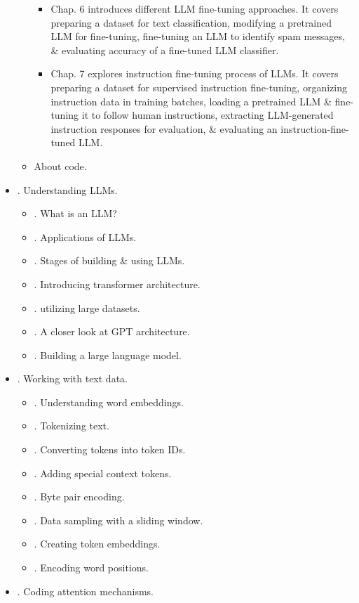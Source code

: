 \documentclass{article}
\begin{document}
\begin{itemize}
\begin{itemize}
\begin{itemize}
			\item Chap. 6 introduces different LLM fine-tuning approaches. It covers preparing a dataset for text classification, modifying a pretrained LLM for fine-tuning, fine-tuning an LLM to identify spam messages, \& evaluating accuracy of a fine-tuned LLM classifier.
			\item Chap. 7 explores instruction fine-tuning process of LLMs. It covers preparing a dataset for supervised instruction fine-tuning, organizing instruction data in training batches, loading a pretrained LLM \& fine-tuning it to follow human instructions, extracting LLM-generated instruction responses for evaluation, \& evaluating an instruction-fine-tuned LLM.
		\end{itemize}
		\item {\sf About code.}
	\end{itemize}
	\item {. Understanding LLMs.}
	\begin{itemize}
		\item {. What is an LLM?}
		\item {. Applications of LLMs.}
		\item {. Stages of building \& using LLMs.}
		\item {. Introducing transformer architecture.}
		\item {. utilizing large datasets.}
		\item {. A closer look at GPT architecture.}
		\item {. Building a large language model.}
	\end{itemize}
	\item {. Working with text data.}
	\begin{itemize}
		\item {. Understanding word embeddings.}
		\item {. Tokenizing text.}
		\item {. Converting tokens into token IDs.}
		\item {. Adding special context tokens.}
		\item {. Byte pair encoding.}
		\item {. Data sampling with a sliding window.}
		\item {. Creating token embeddings.}
		\item {. Encoding word positions.}
	\end{itemize}
	\item {. Coding attention mechanisms.}

\end{itemize}
\end{document}
